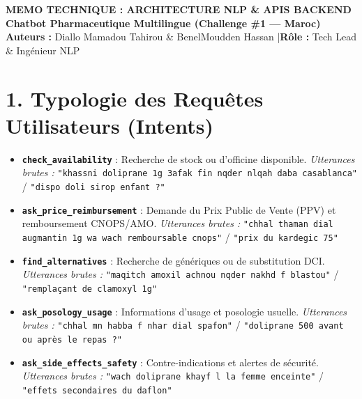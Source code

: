 \documentclass[10pt,a4paper]{article}
\begin{document}
\begin{center}
    {\color{primary}\Large \bfseries MEMO TECHNIQUE : ARCHITECTURE NLP \& APIS BACKEND}\\[2pt]
    {\color{secondary}\bfseries Chatbot Pharmaceutique Multilingue (Challenge \#1 --- Maroc)}\\[2pt]
    {\small \color{darktext} \textbf{Auteurs :} Diallo Mamadou Tahirou \& BenelMoudden Hassan \quad|\quad \textbf{Rôle :} Tech Lead \& Ingénieur NLP}
\end{center}

\vspace{-4pt}

\section*{1. Typologie des Requêtes Utilisateurs (Intents)}
\begin{itemize}
    \item \textbf{\texttt{check\_availability}} : Recherche de stock ou d'officine disponible.\newline
    \textit{Utterances brutes :} \texttt{"khassni doliprane 1g 3afak fin nqder nlqah daba casablanca"} / \texttt{"dispo doli sirop enfant ?"}
    \item \textbf{\texttt{ask\_price\_reimbursement}} : Demande du Prix Public de Vente (PPV) et remboursement CNOPS/AMO.\newline
    \textit{Utterances brutes :} \texttt{"chhal thaman dial augmantin 1g wa wach remboursable cnops"} / \texttt{"prix du kardegic 75"}
    \item \textbf{\texttt{find\_alternatives}} : Recherche de génériques ou de substitution DCI.\newline
    \textit{Utterances brutes :} \texttt{"maqitch amoxil achnou nqder nakhd f blastou"} / \texttt{"remplaçant de clamoxyl 1g"}
    \item \textbf{\texttt{ask\_posology\_usage}} : Informations d'usage et posologie usuelle.\newline
    \textit{Utterances brutes :} \texttt{"chhal mn habba f nhar dial spafon"} / \texttt{"doliprane 500 avant ou après le repas ?"}
    \item \textbf{\texttt{ask\_side\_effects\_safety}} : Contre-indications et alertes de sécurité.\newline
    \textit{Utterances brutes :} \texttt{"wach doliprane khayf l la femme enceinte"} / \texttt{"effets secondaires du daflon"}
\end{itemize}
\end{document}
